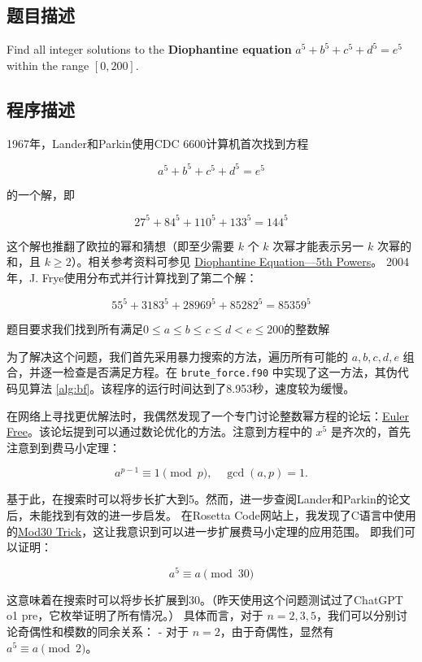 \subsection{题目描述}
Find all integer solutions to the \textbf{Diophantine equation} \( a^5 + b^5 + c^5 + d^5 = e^5 \) within the range \([0, 200]\).
\subsection{程序描述}

1967年，Lander和Parkin使用CDC 6600计算机首次找到方程

\[
    a^5 + b^5 + c^5 + d^5 = e^5
\]

的一个解，即

\[
    27^5 + 84^5 + 110^5 + 133^5 = 144^5
\]

这个解也推翻了欧拉的幂和猜想（即至少需要 \(k\) 个 \(k\) 次幂才能表示另一 \(k\) 次幂的和，且 \(k \geq 2\)）。相关参考资料可参见 \href{https://mathworld.wolfram.com/DiophantineEquation5thPowers.html}{Diophantine Equation—5th Powers}。
2004年，J. Frye使用分布式并行计算找到了第二个解：

\[
    55^5 + 3183^5 + 28969^5 + 85282^5 = 85359^5
\]

题目要求我们找到所有满足$0 \leq a \leq b \leq c \leq d < e \leq 200 $的整数解

为了解决这个问题，我们首先采用暴力搜索的方法，遍历所有可能的 \(a, b, c, d, e\) 组合，并逐一检查是否满足方程。在 \texttt{brute\_force.f90} 中实现了这一方法，其伪代码见算法 \ref{alg:bf}。该程序的运行时间达到了8.953秒，速度较为缓慢。

在网络上寻找更优解法时，我偶然发现了一个专门讨论整数幂方程的论坛：\href{http://euler.free.fr/}{Euler Free}。该论坛提到可以通过数论优化的方法。注意到方程中的 \(x^5\) 是齐次的，首先注意到到费马小定理：

\[
    a^{p-1} \equiv 1 \pmod{p}, \quad \gcd(a,p)=1.
\]

基于此，在搜索时可以将步长扩大到5。然而，进一步查阅Lander和Parkin的论文后，未能找到有效的进一步启发。
在Rosetta Code网站上，我发现了C语言中使用的\href{https://rosettacode.org/wiki/Euler%27s_sum_of_powers_conjecture#C}{Mod30 Trick}，这让我意识到可以进一步扩展费马小定理的应用范围。
即我们可以证明：

\[
    a^5 \equiv a \pmod{30}
\]

这意味着在搜索时可以将步长扩展到30。（昨天使用这个问题测试过了ChatGPT o1 pre，它枚举证明了所有情况。）
具体而言，对于 \(n = 2, 3, 5\)，我们可以分别讨论奇偶性和模数的同余关系：
- 对于 \(n = 2\)，由于奇偶性，显然有 \(a^5 \equiv a \pmod{2}\)。


